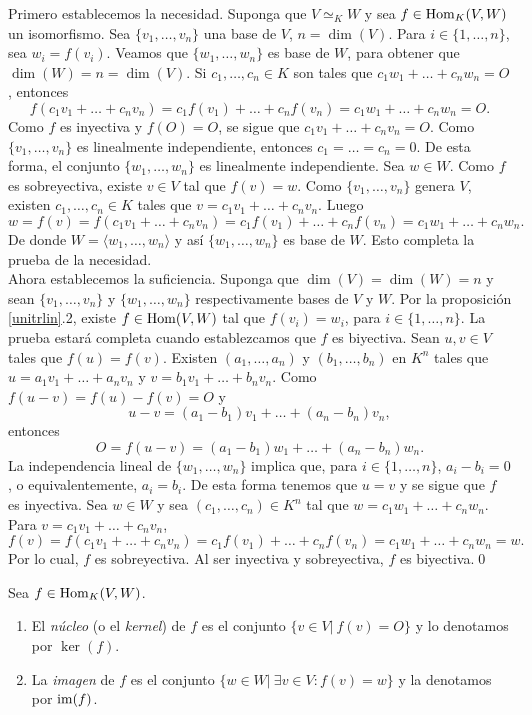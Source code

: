 \dem Primero establecemos la necesidad. Suponga que $V\simeq_K W$ y sea $f\in\operatorname{Hom}_K(V,W)$ un isomorfismo. Sea $\{v_1,\ldots,v_n\}$ una base de $V$, $n=\dim(V)$. Para $i\in\{1,\ldots,n\}$, sea $w_i=f(v_i)$. Veamos que $\{w_1,\ldots,w_n\}$ es base de $W$, para obtener que $\dim(W)=n=\dim(V)$. Si $c_1,\ldots,c_n\in K$ son tales que $c_1w_1+\ldots+c_nw_n=O$, entonces
\[
f(c_1v_1+\ldots+c_nv_n)=c_1f(v_1)+\ldots+c_nf(v_n)=c_1w_1+\ldots+c_nw_n=O.
\]
Como $f$ es inyectiva y $f(O)=O$, se sigue que $c_1v_1+\ldots+c_nv_n=O$. Como $\{v_1,\ldots,v_n\}$ es linealmente independiente, entonces $c_1=\ldots=c_n=0$. De esta forma, el conjunto $\{w_1,\ldots,w_n\}$ es linealmente independiente. Sea $w\in W$. Como $f$ es sobreyectiva, existe $v\in V$ tal que $f(v)=w$. Como $\{v_1,\ldots,v_n\}$ genera $V$, existen $c_1,\ldots,c_n\in K$ tales que $v=c_1v_1+\ldots+c_nv_n$. Luego
\[
w=f(v)=f(c_1v_1+\ldots+c_nv_n)=c_1f(v_1)+\ldots+c_nf(v_n)=c_1w_1+\ldots+c_nw_n.
\]
De donde $W=\langle w_1,\ldots,w_n\rangle$ y as\'i $\{w_1,\ldots,w_n\}$ es base de $W$. Esto completa la prueba de la necesidad.\\
Ahora establecemos la suficiencia. Suponga que $\dim(V)=\dim(W)=n$ y sean $\{v_1,\ldots,v_n\}$ y $\{w_1,\ldots,w_n\}$ respectivamente bases de $V$ y $W$. Por la proposici\'on \ref{unitrlin}.2, existe $f\in\operatorname{Hom}(V,W)$ tal que $f(v_i)=w_i$, para $i\in\{1,\ldots,n\}$. La prueba estar\'a completa cuando establezcamos que $f$ es biyectiva. Sean $u,v\in V$ tales que $f(u)=f(v)$. Existen $(a_1,\ldots,a_n)$ y $(b_1,\ldots,b_n)$ en $K^n$ tales que $u=a_1v_1+\ldots+a_nv_n$ y $v=b_1v_1+\ldots+b_nv_n$. Como $f(u-v)=f(u)-f(v)=O$ y
\[
u-v=(a_1-b_1)v_1+\ldots+(a_n-b_n)v_n,
\]
entonces
\[
O=f(u-v)=(a_1-b_1)w_1+\ldots+(a_n-b_n)w_n.
\]
La independencia lineal de $\{w_1,\ldots,w_n\}$ implica que, para $i\in\{1,\ldots,n\}$, $a_i-b_i=0$, o equivalentemente, $a_i=b_i$. De esta forma tenemos que $u=v$ y se sigue que $f$ es inyectiva. Sea $w\in W$ y sea $(c_1,\ldots, c_n)\in K^n$ tal que $w=c_1w_1+\ldots+c_nw_n$. Para $v=c_1v_1+\ldots+c_nv_n$,
\[
f(v)=f(c_1v_1+\ldots+c_nv_n)=c_1f(v_1)+\ldots+c_nf(v_n)=c_1w_1+\ldots+c_nw_n=w.
\]
Por lo cual, $f$ es sobreyectiva. Al ser inyectiva y sobreyectiva, $f$ es biyectiva.\qed

\begin{defn}
Sea $f\in\operatorname{Hom}_K(V,W)$.
\begin{enumerate}
\item El \emph{n\'ucleo} (o el \emph{kernel}) de $f$ es el conjunto $\{v\in V|\ f(v)=O\}$ y  lo denotamos por $\ker(f)$.
\item La \emph{imagen} de $f$ es el conjunto $\{w\in W|\ \exists v\in V: f(v)=w\}$ y la denotamos por
$\operatorname{im}(f)$.
\end{enumerate}
\end{defn}

